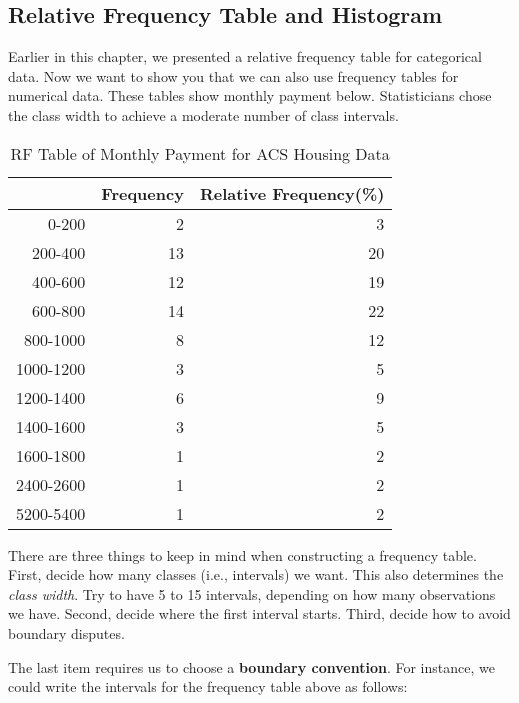 \documentclass[11pt]{book}\usepackage[]{graphicx}\usepackage[]{color}
\begin{document}
\subsection{Relative Frequency Table and Histogram}   

Earlier in this chapter, we presented a relative frequency table for categorical data.  Now we want to show you that we can also use frequency tables for numerical data.  These tables show monthly payment below.  Statisticians chose the class width to achieve a moderate number of class intervals.

{\small{
\begin{table}[ht]
\centering
\begin{tabular}{rrr}
  \hline
 & Frequency & Relative Frequency(\%) \\ 
  \hline
0-200 & 2 & 3 \\ 
  200-400 & 13 & 20 \\ 
  400-600 & 12 & 19 \\ 
  600-800 & 14 & 22 \\ 
  800-1000 & 8 & 12 \\ 
  1000-1200 & 3 & 5 \\ 
  1200-1400 & 6 & 9 \\ 
  1400-1600 & 3 & 5 \\ 
  1600-1800 & 1 & 2 \\ 
  2400-2600 & 1 & 2 \\ 
  5200-5400 & 1 & 2 \\ 
   \hline
\end{tabular}
\caption{RF Table of Monthly Payment for ACS Housing Data} 
\end{table}

}}

There are three things to keep in mind when constructing a frequency table. First, decide how many classes (i.e., intervals) we want.  This also determines the \textit{class width}.  Try to have 5 to 15 intervals, depending on how many observations we have. Second, decide where the first interval starts.  Third, decide how to avoid boundary disputes.  

The last item requires us to choose a \textbf{boundary convention}.  For instance, we could write the intervals for the frequency table above as follows:

\vspace{3mm}
\end{document}
